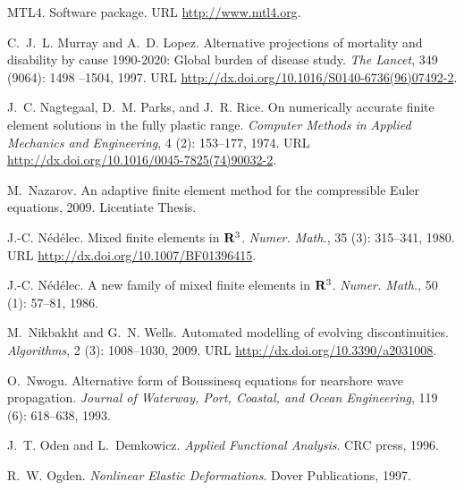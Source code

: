 \begin{thebibliography}{467}
MTL4.
\newblock Software package.
\newblock URL \url{http://www.mtl4.org}.

C.~J.~L. Murray and A.~D. Lopez.
\newblock Alternative projections of mortality and disability by cause
  1990-2020: Global burden of disease study.
\newblock \emph{The Lancet}, 349 (9064): 1498 --1504, 1997.
\newblock URL \url{http://dx.doi.org/10.1016/S0140-6736(96)07492-2}.

J.~C. Nagtegaal, D.~M. Parks, and J.~R. Rice.
\newblock On numerically accurate finite element solutions in the fully plastic
  range.
\newblock \emph{Computer Methods in Applied Mechanics and Engineering},
  4 (2): 153--177, 1974.
\newblock URL \url{http://dx.doi.org/10.1016/0045-7825(74)90032-2}.

M.~Nazarov.
\newblock An adaptive finite element method for the compressible {E}uler
  equations, 2009.
\newblock Licentiate Thesis.

J.-C. N{\'e}d{\'e}lec.
\newblock Mixed finite elements in {${\bf R}^{3}$}.
\newblock \emph{Numer. Math.}, 35 (3): 315--341, 1980.
\newblock URL \url{http://dx.doi.org/10.1007/BF01396415}.

J.-C. N{\'e}d{\'e}lec.
\newblock A new family of mixed finite elements in {${\bf R}\sp 3$}.
\newblock \emph{Numer. Math.}, 50 (1): 57--81, 1986.

M.~Nikbakht and G.~N. Wells.
\newblock Automated modelling of evolving discontinuities.
\newblock \emph{Algorithms}, 2 (3): 1008--1030, 2009.
\newblock URL \url{http://dx.doi.org/10.3390/a2031008}.

O.~Nwogu.
\newblock Alternative form of {B}oussinesq equations for nearshore wave
  propagation.
\newblock \emph{Journal of Waterway, Port, Coastal, and Ocean Engineering},
  119 (6): 618--638, 1993.

J.~T. Oden and L.~Demkowicz.
\newblock \emph{Applied Functional Analysis}.
\newblock CRC press, 1996.

R.~W. Ogden.
\newblock \emph{Nonlinear Elastic Deformations}.
\newblock Dover Publications, 1997.


\end{thebibliography}
